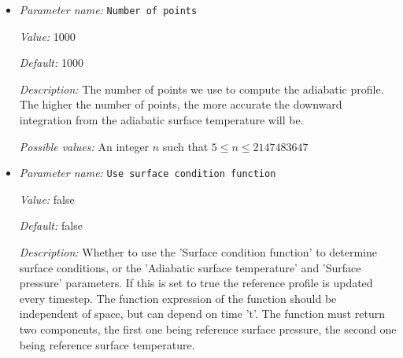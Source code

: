 \begin{itemize}
{\it Value:} 0


{\it Default:} 0


{\it Description:} The formula that denotes the function you want to evaluate for particular values of the independent variables. This expression may contain any of the usual operations such as addition or multiplication, as well as all of the common functions such as `sin' or `cos'. In addition, it may contain expressions like `if(x>0, 1, -1)' where the expression evaluates to the second argument if the first argument is true, and to the third argument otherwise. For a full overview of possible expressions accepted see the documentation of the muparser library at http://muparser.beltoforion.de/.

If the function you are describing represents a vector-valued function with multiple components, then separate the expressions for individual components by a semicolon.


{\it Possible values:} Any string
\item {\it Parameter name:} {\tt Number of points}
\label{parameters:Adiabatic conditions model/Compute profile/Number of points}


{\it Value:} 1000


{\it Default:} 1000


{\it Description:} The number of points we use to compute the adiabatic profile. The higher the number of points, the more accurate the downward integration from the adiabatic surface temperature will be.


{\it Possible values:} An integer $n$ such that $5\leq n \leq 2147483647$
\item {\it Parameter name:} {\tt Use surface condition function}
\label{parameters:Adiabatic conditions model/Compute profile/Use surface condition function}


{\it Value:} false


{\it Default:} false


{\it Description:} Whether to use the 'Surface condition function' to determine surface conditions, or the 'Adiabatic surface temperature' and 'Surface pressure' parameters. If this is set to true the reference profile is updated every timestep. The function expression of the function should be independent of space, but can depend on time 't'. The function must return two components, the first one being reference surface pressure, the second one being reference surface temperature.



\end{itemize}
